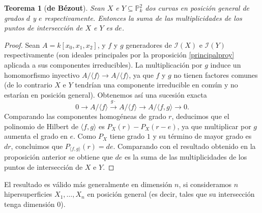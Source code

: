 \documentclass[a4paper,10pt]{book}
\newtheorem{thm}{Teorema}[chapter]
\newcommand{\PP}{\mathbb P}
\newcommand{\II}{{\mathcal I}}
\begin{document}
\begin{thm}[\bf de Bézout]
Sean $X$ e $Y\subseteq\PP^2_k$ dos curvas en posición general de grados $d$ y $e$ respectivamente. Entonces la suma de las multiplicidades de los puntos de intersección de $X$ e $Y$ es $de$.
\end{thm}

\begin{proof}
 Sean $A=k[x_0,x_1,x_2]$, y $f$ y $g$ generadores de $\II(X)$ e $\II(Y)$ respectivamente (son ideales principales por la proposición \ref{principalproy} aplicada a sus componentes irreducibles). La multiplicación por $g$ induce un homomorfismo inyectivo $A/\langle f\rangle\to A/\langle f\rangle$, ya que $f$ y $g$ no tienen factores comunes (de lo contrario $X$ e $Y$ tendrían una componente irreducible en común y no estarían en posición general). Obtenemos así una sucesión exacta
$$
0\to A/\langle f\rangle\stackrel{g\cdot}{\to} A/\langle f\rangle\to A/\langle f,g\rangle\to 0.
$$
Comparando las componentes homogéneas de grado $r$, deducimos que el polinomio de Hilbert de $\langle f,g\rangle$ es $P_X(r)-P_X(r-e)$, ya que multiplicar por $g$ aumenta el grado en $e$. Como $P_X$ tiene grado $1$ y su término de mayor grado es $dr$, concluimos que $P_{\langle f,g\rangle}(r)=de$. Comparando con el resultado obtenido en la proposición anterior se obtiene que $de$ es la suma de las multiplicidades de los puntos de intersección de $X$ e $Y$. 
\end{proof}

El resultado es válido más generalmente en dimensión $n$, si consideramos $n$ hipersuperficies $X_1,\ldots,X_n$ en posición general (es decir, tales que su intersección tenga dimensión $0$).
\end{document}
